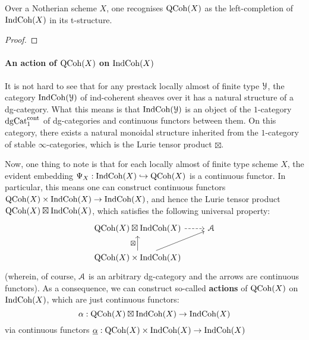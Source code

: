                    \begin{proposition} \label{prop: qcoh_is_the_left_completion_of_indcoh}
                        Over a Notherian scheme $X$, one recognises $\mathrm{QCoh}(X)$ as the left-completion of $\mathrm{Ind}\mathrm{Coh}(X)$ in its t-structure.
                    \end{proposition}
                        \begin{proof}
                            
                        \end{proof}
                    
                \paragraph{An action of \texorpdfstring{$\mathrm{QCoh}(X)$}{} on \texorpdfstring{$\mathrm{Ind}\mathrm{Coh}(X)$}{}}
                    It is not hard to see that for any prestack locally almost of finite type $\mathcal{Y}$, the category $\mathrm{Ind}\mathrm{Coh}(\mathcal{Y})$ of ind-coherent sheaves over it has a natural structure of a dg-category. What this means is that $\mathrm{Ind}\mathrm{Coh}(\mathcal{Y})$ is an object of the $1$-category $\mathrm{dg}\mathrm{Cat}^{\mathrm{cont}}_1$ of dg-categories and continuous functors between them. On this category, there exists a natural monoidal structure inherited from the $1$-category of stable $\infty$-categories, which is the Lurie tensor product $\boxtimes$. 
                
                    Now, one thing to note is that for each locally almost of finite type scheme $X$, the evident embedding $\Psi_X: \mathrm{Ind}\mathrm{Coh}(X) \hookrightarrow \mathrm{QCoh}(X)$ is a continuous functor. In particular, this means one can construct continuous functors $\QCoh(X) \x \Ind\Coh(X) \to \Ind\Coh(X)$, and hence the Lurie tensor product $\mathrm{QCoh}(X) \boxtimes \mathrm{Ind}\mathrm{Coh}(X)$, which satisfies the following universal property:
                        $$
                            \begin{tikzcd}
                            	{\QCoh(X) \boxtimes \Ind\Coh(X)} & \calA \\
                            	{\QCoh(X) \x \Ind\Coh(X)}
                            	\arrow[from=2-1, to=1-2]
                            	\arrow[dashed, from=1-1, to=1-2]
                            	\arrow["\boxtimes", from=2-1, to=1-1]
                            \end{tikzcd}
                        $$
                    (wherein, of course, $\mathcal{A}$ is an arbitrary dg-category and the arrows are continuous functors). As a consequence, we can construct so-called \textbf{actions} of $\mathrm{QCoh}(X)$ on $\mathrm{Ind}\mathrm{Coh}(X)$, which are just continuous functors:
                        $$\alpha: \mathrm{QCoh}(X) \boxtimes \mathrm{Ind}\mathrm{Coh}(X) \to \mathrm{Ind}\mathrm{Coh}(X)$$
                    via continuous functors $\underline{\alpha}: \QCoh(X) \x \Ind\Coh(X) \to \Ind\Coh(X)$
                        
